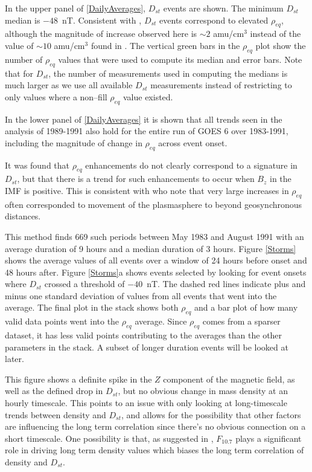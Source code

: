 \documentclass[10pt,twocolumn]{article}
\begin{document}
In the upper panel of \ref{DailyAverages}, $D_{st}$ events are shown.  The minimum $D_{st}$ median is $-48$~nT.  Consistent with \cite{Takahashi2010}, $D_{st}$ events correspond to elevated $\rho_{eq}$, although the magnitude of increase observed here is $\sim 2$ amu/cm$^3$ instead of the value of $\sim 10$ amu/cm$^3$ found in \cite{Takahashi2010}.  The vertical green bars in the $\rho_{eq}$ plot show the number of $\rho_{eq}$ values that were used to compute its median and error bars.  Note that for $D_{st}$, the number of measurements used in computing the medians is much larger as we use all available $D_{st}$ measurements instead of restricting to only values where a non--fill $\rho_{eq}$ value existed.  

In the lower panel of \ref{DailyAverages} it is shown that all trends seen in the analysis of 1989-1991 also hold for the entire run of GOES 6 over 1983-1991, including the magnitude of change in $\rho_{eq}$ across event onset.

It was found that $\rho_{eq}$ enhancements do not clearly correspond to a signature in $D_{st}$, but that there is a trend for such enhancements to occur when $B_{z}$ in the IMF is positive.  This is consistent with \cite{Takahashi2010} who note that very large increases in $\rho_{eq}$ often corresponded to movement of the plasmasphere to beyond geosynchronous distances. 

This method finds 669 such periods between May 1983 and August 1991 with an average duration of 9 hours and a median duration of 3 hours. Figure \ref{Storms} shows the average values of all events over a window of 24 hours before onset and 48 hours after. Figure \ref{Storms}a shows events selected by looking for event onsets where $D_{st}$ crossed a threshold of $-40$~nT. The dashed red lines indicate plus and minus one standard deviation of values from all events that went into the average. The final plot in the stack shows both $\rho_{eq}$ and a bar plot of how many valid data points went into the $\rho_{eq}$ average. Since $\rho_{eq}$ comes from a sparser dataset, it has less valid points contributing to the averages than the other parameters in the stack. A subset of longer duration events will be looked at later. 

This figure shows a definite spike in the $Z$ component of the magnetic field, as well as the defined drop in $D_{st}$, but no obvious change in mass density at an hourly timescale. This points to an issue with only looking at long-timescale trends between density and $D_{st}$, and allows for the possibility that other factors are influencing the long term correlation since there's no obvious connection on a short timescale. One possibility is that, as suggested in \cite{Takahashi2010}, $F_{10.7}$ plays a significant role in driving long term density values which biases the long term correlation of density and $D_{st}$.
\end{document}
